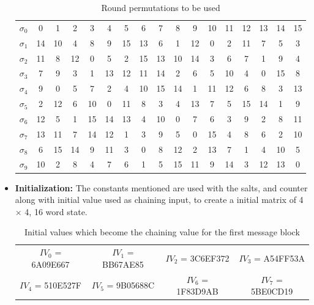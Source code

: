 \begin{itemize}
      \begin{table}
        \begin{center}
          \begin{tabular}{ c| *{16}{c}} \hline
            $\sigma_{0}$ & 0  & 1  & 2  & 3  & 4  & 5  & 6  & 7  & 8  & 9  & 10 & 11 & 12 & 13 & 14 & 15 \\
            $\sigma_{1}$ & 14 & 10 & 4  & 8  & 9  & 15 & 13 & 6  & 1  & 12 & 0  & 2  & 11 & 7  & 5  & 3  \\
            $\sigma_{2}$ & 11 & 8  & 12 & 0  & 5  & 2  & 15 & 13 & 10 & 14 & 3  & 6  & 7  & 1  & 9  & 4  \\
            $\sigma_{3}$ & 7  & 9  & 3  & 1  & 13 & 12 & 11 & 14 & 2  & 6  & 5  & 10 & 4  & 0  & 15 & 8  \\
            $\sigma_{4}$ & 9  & 0  & 5  & 7  & 2  & 4  & 10 & 15 & 14 & 1  & 11 & 12 & 6  & 8  & 3  & 13 \\
            $\sigma_{5}$ & 2  & 12 & 6  & 10 & 0  & 11 & 8  & 3  & 4  & 13 & 7  & 5  & 15 & 14 & 1  & 9  \\
            $\sigma_{6}$ & 12 & 5  & 1  & 15 & 14 & 13 & 4  & 10 & 0  & 7  & 6  & 3  & 9  & 2  & 8  & 11 \\
            $\sigma_{7}$ & 13 & 11 & 7  & 14 & 12 & 1  & 3  & 9  & 5  & 0  & 15 & 4  & 8  & 6  & 2  & 10 \\
            $\sigma_{8}$ & 6  & 15 & 14 & 9  & 11 & 3  & 0  & 8  & 12 & 2  & 13 & 7  & 1  & 4  & 10 & 5  \\
            $\sigma_{9}$ & 10 & 2  & 8  & 4  & 7  & 6  & 1  & 5  & 15 & 11 & 9  & 14 & 3  & 12 & 13 & 0  \\ \hline
          \end{tabular}
          \caption{Round permutations to be used \cite{00002}}
        \end{center}
      \end{table}
    
    \item {\bf Initialization: } The constants mentioned are used with the salts, and counter along with initial
    value used as chaining input, to create a initial matrix of 4 $\times$ 4, 16 word state.

      \begin{table}[h]
        \begin{center}
          \begin{tabular}{ *{4}{c}}
            $IV_{0}$ = 6A09E667 & $IV_{1}$ = BB67AE85 & $IV_{2}$ = 3C6EF372 & $IV_{3}$ = A54FF53A \\
            $IV_{4}$ = 510E527F & $IV_{5}$ = 9B05688C & $IV_{6}$ = 1F83D9AB & $IV_{7}$ = 5BE0CD19 \\
          \end{tabular}
          \caption{Initial values which become the chaining value for the first message block \cite{00002}}
        \end{center}
      \end{table}
      

\end{itemize}
